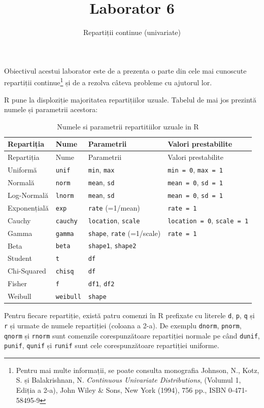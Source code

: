 \documentclass[]{article}
\title{Laborator 6}
\subtitle{Repartiții continue (univariate)}
\author{}
\date{}
\let\rmarkdownfootnote\footnote%
\def\footnote{\protect\rmarkdownfootnote}
\begin{document}
\maketitle

\thispagestyle{fancy}

Obiectivul acestui laborator este de a prezenta o parte din cele mai
cunoscute repartiții continue\footnote{Pentru mai multe informații, se
  poate consulta monografia Johnson, N., Kotz, S. și Balakrishnan, N.
  \emph{Continuous Univariate Distributions}, (Volumul 1, Ediția a 2-a),
  John Wiley \& Sons, New York (1994), 756 pp., ISBN 0-471-58495-9} și
de a rezolva câteva probleme cu ajutorul lor.

R pune la disploziție majoritatea repartițiilor uzuale. Tabelul de mai
jos prezintă numele și parametrii acestora:

\begin{longtable}[]{@{}llll@{}}
\caption{Numele si parametrii repartitiilor uzuale in R}\tabularnewline
\toprule
Repartiția & Nume & Parametrii & Valori prestabilite\tabularnewline
\midrule
\endfirsthead
\toprule
Repartiția & Nume & Parametrii & Valori prestabilite\tabularnewline
\midrule
\endhead
Uniformă & \texttt{unif} & \texttt{min}, \texttt{max} &
\texttt{min\ =\ 0}, \texttt{max\ =\ 1}\tabularnewline
Normală & \texttt{norm} & \texttt{mean}, \texttt{sd} &
\texttt{mean\ =\ 0}, \texttt{sd\ =\ 1}\tabularnewline
Log-Normală & \texttt{lnorm} & \texttt{mean}, \texttt{sd} &
\texttt{mean\ =\ 0}, \texttt{sd\ =\ 1}\tabularnewline
Exponențială & \texttt{exp} & \texttt{rate} (=1/mean) &
\texttt{rate\ =\ 1}\tabularnewline
Cauchy & \texttt{cauchy} & \texttt{location}, \texttt{scale} &
\texttt{location\ =\ 0}, \texttt{scale\ =\ 1}\tabularnewline
Gamma & \texttt{gamma} & \texttt{shape}, \texttt{rate} (=1/scale) &
\texttt{rate\ =\ 1}\tabularnewline
Beta & \texttt{beta} & \texttt{shape1}, \texttt{shape2} &\tabularnewline
Student & \texttt{t} & \texttt{df} &\tabularnewline
Chi-Squared & \texttt{chisq} & \texttt{df} &\tabularnewline
Fisher & \texttt{f} & \texttt{df1}, \texttt{df2} &\tabularnewline
Weibull & \texttt{weibull} & \texttt{shape} &\tabularnewline
\bottomrule
\end{longtable}

Pentru fiecare repartiție, există patru comenzi în R prefixate cu
literele \texttt{d}, \texttt{p}, \texttt{q} și \texttt{r} și urmate de
numele repartiției (coloana a 2-a). De exemplu \texttt{dnorm},
\texttt{pnorm}, \texttt{qnorm} și \texttt{rnorm} sunt comenzile
corespunzătoare repartiției normale pe când \texttt{dunif},
\texttt{punif}, \texttt{qunif} și \texttt{runif} sunt cele
corespunzătoare repartiției uniforme.
\end{document}
